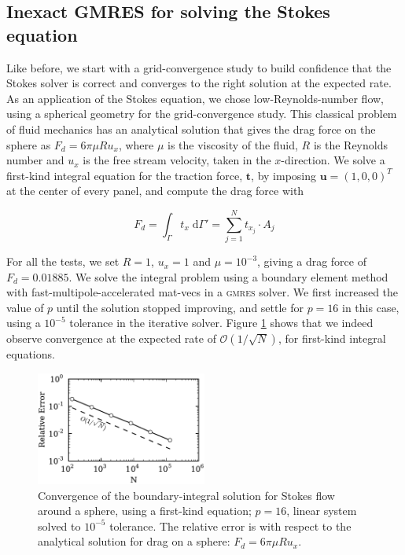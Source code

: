 \documentclass[final,leqno,]{siamltex1213}
\renewcommand{\O}[1]{\mathcal{O}(#1)}
\newcommand{\gmres}{\textsc{gmres}\xspace}
\newcommand{\di}[1]{\text{d}#1}
\newcommand{\vect}[1]{\mathbf{#1}}
\begin{document}
\subsection{Inexact {\small GMRES} for solving the Stokes equation}
Like before, we start with a grid-convergence study to build confidence that the Stokes solver is correct and converges to the right solution at the expected rate. As an application of the Stokes equation, we chose low-Reynolds-number flow, using a spherical geometry for the grid-convergence study. This classical problem of fluid mechanics has an analytical solution that gives the drag force on the sphere as $F_d = 6\pi\mu Ru_x$, where $\mu$ is the viscosity of the fluid, $R$ is the Reynolds number and $u_x$ is the free stream velocity, taken in the $x$-direction. We solve a first-kind integral equation for the traction force, $\vect{t}$, by imposing $\vect{u} = (1,0,0)^{T}$ at the center of every panel, and compute the drag force with

\begin{equation}
	\label{eqn:stokes_traction_drag}
	F_d = \int_\Gamma t_x\;\di{\Gamma'} = \sum_{j=1}^{N} t_{x_j}\cdot A_j
\end{equation}

For all the tests, we set $R=1$, $u_x = 1$ and $\mu = 10^{-3}$, giving a drag force of $F_d = 0.01885$. We solve the integral problem using a boundary element method with fast-multipole-accelerated mat-vecs in a \gmres solver. We first increased the value of $p$ until the solution stopped improving, and settle for $p=16$ in this case, using a $10^{-5}$ tolerance in the iterative solver.
Figure \ref{fig:stokes_convergence} shows that we indeed observe convergence at the expected rate of $\O{1 / \sqrt{N}}$, for first-kind integral equations.

\begin{figure}%
\begin{center}
	\includegraphics[natwidth=3in,natheight=2in,width=0.5\textwidth]{StokesConvergence.pdf}
	\caption{Convergence of the boundary-integral solution for Stokes flow around a sphere, using a  first-kind equation; $p=16$, linear system solved to $10^{-5}$ tolerance. The relative error is with respect to the analytical solution for drag on a sphere: $F_d = 6\pi\mu Ru_x$.}
	\label{fig:stokes_convergence}
\end{center}
\end{figure}
\end{document}
